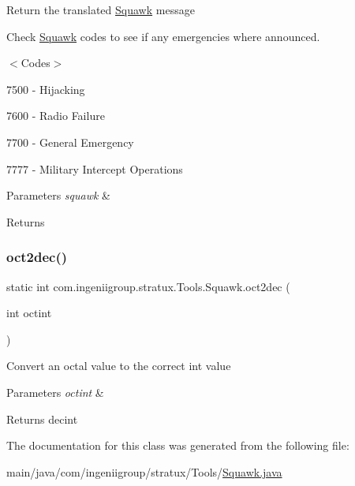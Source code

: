 Return the translated \hyperlink{classcom_1_1ingeniigroup_1_1stratux_1_1_tools_1_1_squawk}{Squawk} message

Check \hyperlink{classcom_1_1ingeniigroup_1_1stratux_1_1_tools_1_1_squawk}{Squawk} codes to see if any emergencies where announced.

$<$\+Codes$>$
\begin{DoxyItemize}
\item 7500 -\/ Hijacking
\item 7600 -\/ Radio Failure
\item 7700 -\/ General Emergency
\item 7777 -\/ Military Intercept Operations
\end{DoxyItemize}


\begin{DoxyParams}{Parameters}
{\em squawk} & \\
\hline
\end{DoxyParams}
\begin{DoxyReturn}{Returns}

\end{DoxyReturn}
\mbox{\label{classcom_1_1ingeniigroup_1_1stratux_1_1_tools_1_1_squawk_ad3bb6928421e825b9362cfe4fc96649f}} 
\subsubsection{\texorpdfstring{oct2dec()}{oct2dec()}}
{\footnotesize\ttfamily static int com.\+ingeniigroup.\+stratux.\+Tools.\+Squawk.\+oct2dec (\begin{DoxyParamCaption}\item[{int}]{octint }\end{DoxyParamCaption})\hspace{0.3cm}{\ttfamily [static]}}

Convert an octal value to the correct int value


\begin{DoxyParams}{Parameters}
{\em octint} & \\
\hline
\end{DoxyParams}
\begin{DoxyReturn}{Returns}
decint 
\end{DoxyReturn}


The documentation for this class was generated from the following file\+:\begin{DoxyCompactItemize}
\item 
main/java/com/ingeniigroup/stratux/\+Tools/\hyperlink{_squawk_8java}{Squawk.\+java}\end{DoxyCompactItemize}
